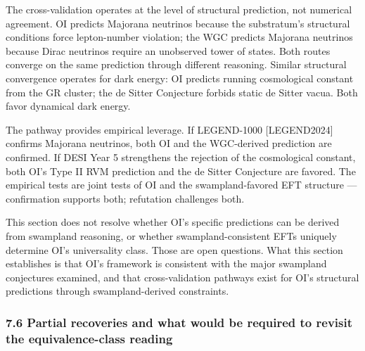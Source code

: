 \documentclass[
]{article}
\begin{document}
The cross-validation operates at the level of structural prediction, not
numerical agreement. OI predicts Majorana neutrinos because the
substratum's structural conditions force lepton-number violation; the
WGC predicts Majorana neutrinos because Dirac neutrinos require an
unobserved tower of states. Both routes converge on the same prediction
through different reasoning. Similar structural convergence operates for
dark energy: OI predicts running cosmological constant from the GR
cluster; the de Sitter Conjecture forbids static de Sitter vacua. Both
favor dynamical dark energy.

The pathway provides empirical leverage. If LEGEND-1000 {[}LEGEND2024{]}
confirms Majorana neutrinos, both OI and the WGC-derived prediction are
confirmed. If DESI Year 5 strengthens the rejection of the cosmological
constant, both OI's Type II RVM prediction and the de Sitter Conjecture
are favored. The empirical tests are joint tests of OI and the
swampland-favored EFT structure --- confirmation supports both;
refutation challenges both.

This section does not resolve whether OI's specific predictions can be
derived from swampland reasoning, or whether swampland-consistent EFTs
uniquely determine OI's universality class. Those are open questions.
What this section establishes is that OI's framework is consistent with
the major swampland conjectures examined, and that cross-validation
pathways exist for OI's structural predictions through swampland-derived
constraints.

\hypertarget{partial-recoveries-and-what-would-be-required-to-revisit-the-equivalence-class-reading}{%
\subsubsection{7.6 Partial recoveries and what would be required to
revisit the equivalence-class
reading}\label{partial-recoveries-and-what-would-be-required-to-revisit-the-equivalence-class-reading}}
\end{document}
